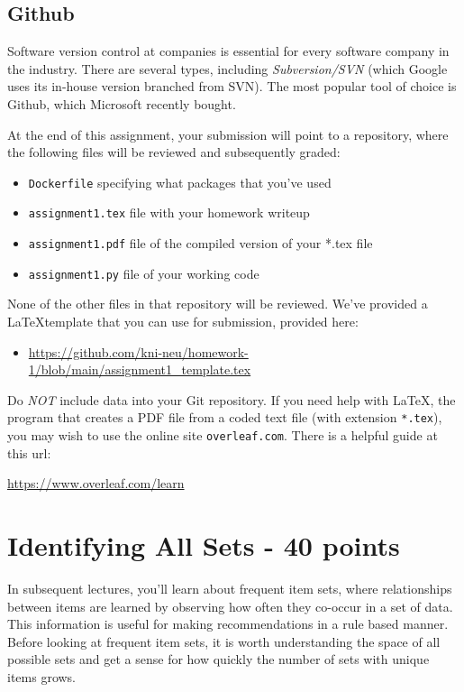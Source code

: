 \documentclass[paper=a4, fontsize=11pt]{scrartcl} %
\begin{document}
\subsection{Github}

Software version control at companies is essential for every software company in the industry. There are several types, including \emph{Subversion/SVN} (which Google uses its in-house version branched from SVN). The most popular tool of choice is Github, which Microsoft recently bought. 

At the end of this assignment, your submission will point to a repository, where the following files will be reviewed and subsequently graded:

\begin{itemize}
    \item \verb"Dockerfile" specifying what packages that you've used
    \item \verb"assignment1.tex" file with your homework writeup
    \item \verb"assignment1.pdf" file of the compiled version of your *.tex file
    \item \verb"assignment1.py" file of your working code
\end{itemize}

None of the other files in that repository will be reviewed. We've provided a \LaTeX template that you can use for submission, provided here:
\begin{itemize}
    \item \url{https://github.com/kni-neu/homework-1/blob/main/assignment1_template.tex}
\end{itemize}

Do \emph{NOT} include data into your Git repository. If you need help with \LaTeX, the program that creates a PDF file from a coded text file (with extension \verb"*.tex"), you may wish to use the online site \verb"overleaf.com". There is a helpful guide at this url:

\url{https://www.overleaf.com/learn}

\section{Identifying All Sets - 40 points}

In subsequent lectures, you'll learn about frequent item sets, where relationships between items are learned by observing how often they co-occur in a set of data. This information is useful for making recommendations in a rule based manner. Before looking at frequent item sets, it is worth understanding the space of all possible sets and get a sense for how quickly the number of sets with unique items grows.
\end{document}
